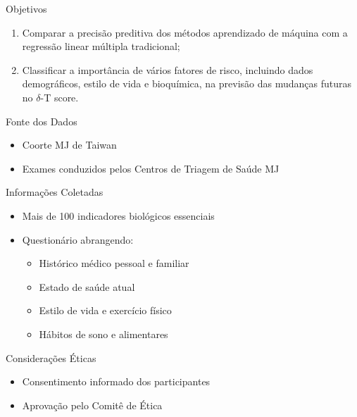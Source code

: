 \begin{frame}{Objetivos}
	\begin{block}{}
			\begin{enumerate}
			\item Comparar a precisão preditiva dos métodos aprendizado de máquina com a regressão linear múltipla tradicional;
			\pause
			\item Classificar a importância de vários fatores de risco, incluindo dados demográficos, estilo de vida e bioquímica, na previsão das mudanças futuras no $\delta$-T score.
		\end{enumerate}
	\end{block}
\end{frame}

\begin{frame}{Fonte dos Dados}
	\begin{block}{}
		\begin{itemize}
			\item Coorte MJ de Taiwan  
			\item Exames conduzidos pelos Centros de Triagem de Saúde MJ  
		\end{itemize}
	\end{block}
\end{frame}

\begin{frame}{Informações Coletadas}
	\begin{itemize}
		\item Mais de 100 indicadores biológicos essenciais  
		\pause
		\item Questionário abrangendo: 
		\pause 
		\begin{itemize}
			\item Histórico médico pessoal e familiar  
			\item Estado de saúde atual  
			\item Estilo de vida e exercício físico  
			\item Hábitos de sono e alimentares  
		\end{itemize}
	\end{itemize}
\end{frame}

\begin{frame}{Considerações Éticas}
	\begin{itemize}
		\item Consentimento informado dos participantes  
		\item Aprovação pelo Comitê de Ética
	\end{itemize}
\end{frame}

